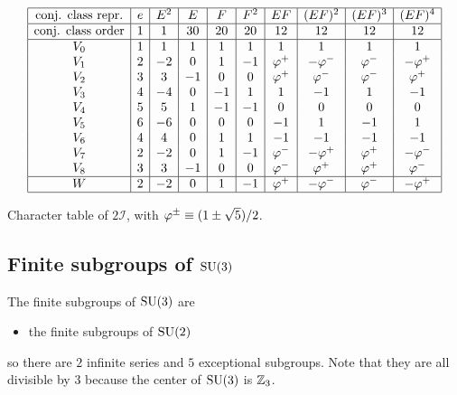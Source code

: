             \begin{table}[H]
                \centering
                {\small
                \begin{equation*}
                        \begin{array}{|c|c|c|c|c|c|c|c|c|c|}
                            \hline
                            \text{conj. class repr.} & e & E^2 & E & F & F^2 & EF & (EF)^2 & (EF)^3 & (EF)^4 \\ \hline
                            \text{conj. class order} & 1 & 1 & 30 & 20 & 20 & 12 & 12 & 12 & 12\\
                            \hline
                            V_0 & 1 & 1 & 1 & 1 & 1 & 1 & 1 & 1 & 1 \\
                            V_1 & 2 & -2 & 0 & 1 & -1 & \varphi^+ & -\varphi^- & \varphi^- & -\varphi^+ \\
                            V_2 & 3 & 3 & -1 & 0 & 0 & \varphi^+ & \varphi^- & \varphi^- & \varphi^+ \\
                            V_3 & 4 & -4 & 0 & -1 & 1 & 1 & -1 & 1 & -1 \\
                            V_4 & 5 & 5 & 1 & -1 & -1 & 0 & 0 & 0 & 0 \\
                            V_5 & 6 & -6 & 0 & 0 & 0 & -1 & 1 & -1 & 1 \\
                            V_6 & 4 & 4 & 0 & 1 & 1 & -1 & -1 & -1 & -1 \\
                            V_7 & 2 & -2 & 0 & 1 & -1 & \varphi^- & -\varphi^+ & \varphi^+ & -\varphi^- \\
                            V_8 & 3 & 3 & -1 & 0 & 0 & \varphi^- & \varphi^+ & \varphi^+ & \varphi^- \\ \hline
                            W & 2 & -2 & 0 & 1 & -1 & \varphi^+ & -\varphi^- & \varphi^- & -\varphi^+ \\ \hline
                        \end{array}
                    \end{equation*}}
                \caption{Character table of $2\mathcal{I}$, with $\varphi^\pm\equiv(1\pm\sqrt{5})/2$.}
            \end{table}


    \subsection{Finite subgroups of $\text{SU}(3)$}

        The finite subgroups of $\text{SU}(3)$ are
        \begin{itemize}
            \item the finite subgroups of $\text{SU}(2)$
        \end{itemize}
        so there are $2$ infinite series and $5$ exceptional subgroups. Note that they are all divisible by $3$ because the center of $\text{SU}(3)$ is $\mathbb{Z}_3$.

